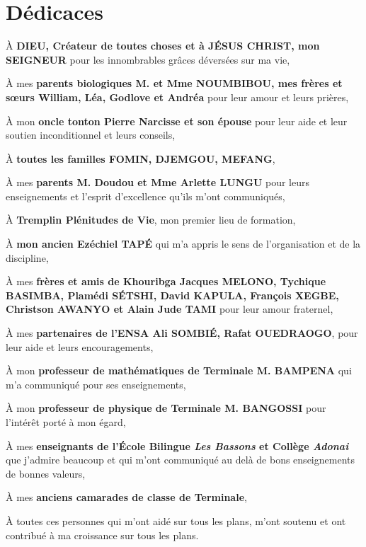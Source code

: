 \chapter*{Dédicaces}
À  \textbf{DIEU, Créateur de toutes choses et à JÉSUS CHRIST, mon SEIGNEUR} pour les innombrables grâces déversées sur ma vie,


À  mes \textbf{parents biologiques M. et Mme NOUMBIBOU, mes frères et sœurs William, Léa, Godlove et Andréa} pour leur amour et leurs prières,


À  mon \textbf{oncle tonton Pierre Narcisse et son épouse} pour leur aide et leur soutien inconditionnel et leurs conseils,


À  \textbf{toutes les familles FOMIN, DJEMGOU, MEFANG},


À  mes \textbf{parents M. Doudou et Mme Arlette LUNGU} pour leurs enseignements et l'esprit d'excellence qu'ils m'ont communiqués,


À  \textbf{Tremplin Plénitudes de Vie}, mon premier lieu de formation,  


À  \textbf{mon ancien Ezéchiel TAPÉ} qui m'a appris le sens de l'organisation et de la discipline, 


À  mes \textbf{frères et amis de Khouribga Jacques MELONO, Tychique BASIMBA, Plamédi SÉTSHI, David KAPULA, François XEGBE, Christson AWANYO et Alain Jude TAMI} pour leur amour fraternel,

À  mes \textbf{partenaires de l'ENSA Ali SOMBIÉ, Rafat OUEDRAOGO}, pour leur aide et leurs encouragements,

À  mon \textbf{professeur de mathématiques de Terminale M. BAMPENA} qui m'a communiqué pour ses enseignements,


À  mon \textbf{professeur de physique de Terminale M. BANGOSSI} pour l'intérêt porté à mon égard,

À  mes \textbf{enseignants de l'École Bilingue \textit{Les Bassons} et Collège \textit{Adonai}} que j'admire beaucoup et qui m'ont communiqué au delà de bons enseignements de bonnes valeurs, 

À  mes \textbf{anciens camarades de classe de Terminale},

À  toutes ces personnes qui m'ont aidé sur tous les plans, m'ont soutenu  et ont contribué à ma croissance sur tous les plans.
